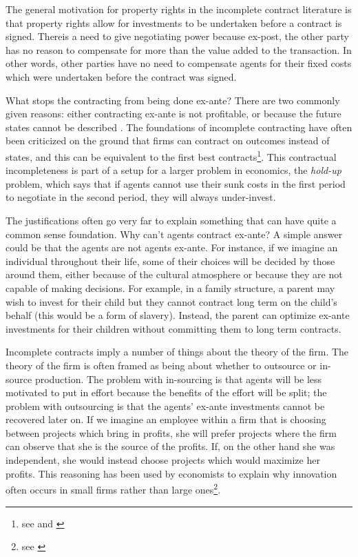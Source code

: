 The general motivation for property rights in the incomplete contract literature is that property rights allow for investments to be undertaken before a contract is signed. Thereis a need to give negotiating power because ex-post, the other party has no reason to compensate for more than the value added to the transaction. In other words, other parties have no need to compensate agents for their fixed costs which were undertaken before the contract was signed.

What stops the contracting from being done ex-ante? There are two commonly given reasons: either contracting ex-ante is not profitable, or because the future states cannot be described \citep{Hart1999}. The foundations of incomplete contracting have often been criticized on the ground that firms can contract on outcomes instead of states, and this can be equivalent to the first best contracts\footnote{see \cite{Maskin2002} and \cite{maskin1999unforeseen}}. This contractual incompleteness is part of a setup for a larger problem in economics, the \textit{hold-up} problem, which says that if agents cannot use their sunk costs in the first period to negotiate in the second period, they will always under-invest.

The justifications often go very far to explain something that can have quite a common sense foundation. Why can't agents contract ex-ante? A simple answer could be that the agents are not agents ex-ante. For instance, if we imagine an individual throughout their life, some of their choices will be decided by those around them, either because of the cultural atmosphere or because they are not capable of making decisions. For example, in a family structure, a parent may wish to invest for their child but they cannot contract long term on the child's behalf (this would be a form of slavery). Instead, the parent can optimize ex-ante investments for their children without committing them to long term contracts.

Incomplete contracts imply a number of things about the theory of the firm. The theory of the firm is often framed as being about whether to outsource or in-source production. The problem with in-sourcing is that agents will be less motivated to put in effort because the benefits of the effort will be split; the problem with outsourcing is that the agents' ex-ante investments cannot be recovered later on. If we imagine an employee within a firm that is choosing between projects which bring in profits, she will prefer projects where the firm can observe that she is the source of the profits. If, on the other hand she was independent, she would instead choose projects which would maximize her profits. This reasoning has been used by economists to explain why innovation often occurs in small firms rather than large ones\footnote{see \cite{Holmstrom1989} }.

